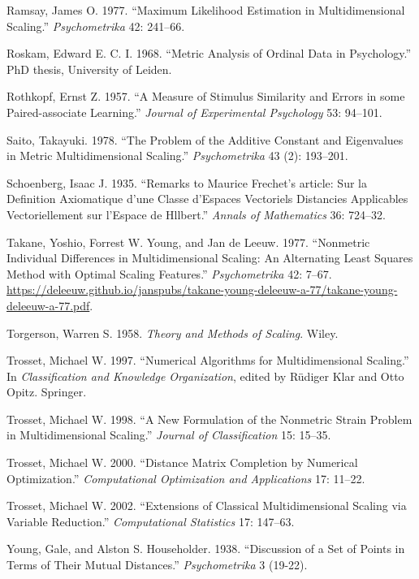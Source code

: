 \documentclass[
  12pt,
  letterpaper,
  DIV=11,
  numbers=noendperiod]{scrartcl}
\newlength{\cslhangindent}
\newenvironment{CSLReferences}[2] %
 {\begin{list}{}{%
  \setlength{\itemindent}{0pt}
  \setlength{\leftmargin}{0pt}
  \setlength{\parsep}{0pt}
  \ifodd #1
   \setlength{\leftmargin}{\cslhangindent}
   \setlength{\itemindent}{-1\cslhangindent}
  \fi
  \setlength{\itemsep}{#2\baselineskip}}}
 {\end{list}}
\begin{document}
\begin{CSLReferences}{1}{1}
Ramsay, James O. 1977. {``{Maximum Likelihood Estimation in
Multidimensional Scaling}.''} \emph{Psychometrika} 42: 241--66.

Roskam, Edward E. C. I. 1968. {``{Metric Analysis of Ordinal Data in
Psychology}.''} PhD thesis, University of Leiden.

Rothkopf, Ernst Z. 1957. {``{A Measure of Stimulus Similarity and Errors
in some Paired-associate Learning}.''} \emph{Journal of Experimental
Psychology} 53: 94--101.

Saito, Takayuki. 1978. {``The Problem of the Additive Constant and
Eigenvalues in Metric Multidimensional Scaling.''} \emph{Psychometrika}
43 (2): 193--201.

Schoenberg, Isaac J. 1935. {``{Remarks to Maurice Frechet's article: Sur
la Definition Axiomatique d'une Classe d'Espaces Vectoriels Distancies
Applicables Vectoriellement sur l'Espace de Hllbert}.''} \emph{Annals of
Mathematics} 36: 724--32.

{Takane, Yoshio, Forrest W. Young, and Jan de Leeuw}. 1977.
{``{Nonmetric Individual Differences in Multidimensional Scaling: An
Alternating Least Squares Method with Optimal Scaling Features}.''}
\emph{Psychometrika} 42: 7--67.
\url{https://deleeuw.github.io/janspubs/takane-young-deleeuw-a-77/takane-young-deleeuw-a-77.pdf}.

Torgerson, Warren S. 1958. \emph{{Theory and Methods of Scaling}}.
Wiley.

Trosset, Michael W. 1997. {``Numerical Algorithms for Multidimensional
Scaling.''} In \emph{Classification and Knowledge Organization}, edited
by Rüdiger Klar and Otto Opitz. Springer.

Trosset, Michael W. 1998. {``A New Formulation of the Nonmetric Strain
Problem in Multidimensional Scaling.''} \emph{Journal of Classification}
15: 15--35.

Trosset, Michael W. 2000. {``Distance Matrix Completion by Numerical
Optimization.''} \emph{Computational Optimization and Applications} 17:
11--22.

Trosset, Michael W. 2002. {``Extensions of Classical Multidimensional
Scaling via Variable Reduction.''} \emph{Computational Statistics} 17:
147--63.

Young, Gale, and Alston S. Householder. 1938. {``{Discussion of a Set of
Points in Terms of Their Mutual Distances}.''} \emph{Psychometrika} 3
(19-22).

\end{CSLReferences}
\end{document}
